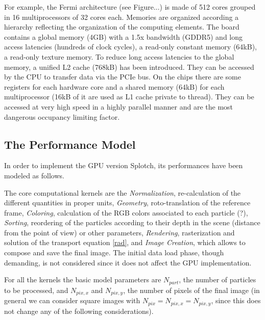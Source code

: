 \documentclass[11pt]{article}
\begin{document}
For example, the Fermi architecture (see Figure...) is made of 512 cores grouped in 16 multiprocessors of 32 cores each. Memories are organized according a hierarchy reflecting the organization of the computing elements. The board contains a global memory (4GB) with a 1.5x bandwidth (GDDR5) and long access latencies (hundreds of clock cycles), a read-only constant memory (64kB), a read-only texture memory. To reduce long access latencies to the global memory, a unified L2 cache (768kB) has been introduced. They can be accessed by the CPU to transfer data via the PCIe bus. On the chips there are some registers for each hardware core and a shared memory (64kB) for each multiprocessor (16kB of it are used as L1 cache private to thread). They can be accessed at very high speed in a highly parallel manner and are the most dangerous occupancy limiting factor.
 

\subsection{The Performance Model}

In order to implement the GPU version Splotch, its performances have been modeled
as follows.

The core computational kernels are the {\it Normalization}, re-calculation
of the different quantities in proper units, {\it Geometry}, roto-translation 
of the reference frame, {\it Coloring}, calculation of the RGB colors associated to each 
particle (?), {\it Sorting}, reordering of the particles according to their depth in 
the scene (distance from the point of view) or other parameters, {\it Rendering},
rasterization and solution of the transport equation \eqref{rad}, 
and {\it Image Creation}, which allows to compose
and save the final image. The initial data load phase, though demanding, is not considered
since it does not affect the GPU implementation.

For all the kernels the basic model parameters are $N_{part}$, the number of particles
to be processed, and $N_{pix,x}$ and $N_{pix,y}$, the number of pixels of the final image
(in general we can consider square images with $N_{pix}=N_{pix,x}=N_{pix,y}$, since this
does not change any of the following considerations). 
\end{document}
